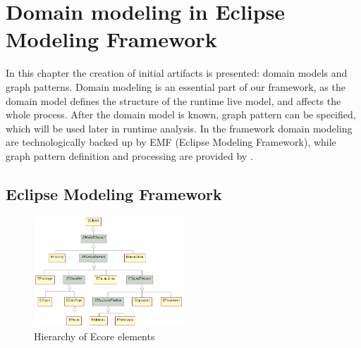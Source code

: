 \chapter{Domain modeling in Eclipse Modeling Framework}

In this chapter the creation of initial artifacts is presented: domain models and graph patterns.
Domain modeling is an essential part of our framework, as the domain model defines the structure of the runtime live model, and affects the whole process. 
After the domain model is known, graph pattern can be specified, which will be used later in runtime analysis.
In the framework domain modeling are technologically backed up by EMF (Eclipse Modeling Framework), 
while graph pattern definition and processing are provided by \viatra{}.

\section{Eclipse Modeling Framework}


\begin{figure}
	\begin{center}
		\includegraphics[width=0.5\textwidth]{figures/EcoreHierarchy.png}
		\caption{Hierarchy of Ecore elements \cite{ecore-package} }
		\label{fig:ecore-hierarchy}
	\end{center}
\end{figure}

